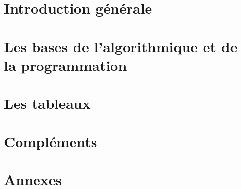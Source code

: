 \documentclass[a4paper,doubleside,11pt]{book}
\begin{document}

	
	
	

	\part{Introduction générale}	
		
		

	\part{Les bases de l'algorithmique et de la programmation}
		
		
		
		
		
		
		

	\part{Les tableaux}
		
		
		
			
	\part{Compléments}
		
		
		

	\appendix
	
	\part{Annexes}
		
		
		
		
	
	
	
\end{document}
